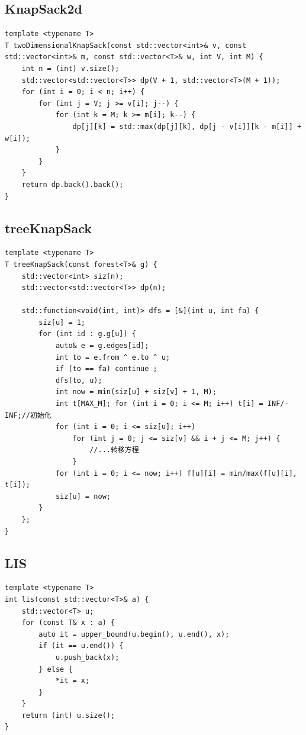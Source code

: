 \documentclass[twoside]{article}
\begin{document}
\subsection{KnapSack2d}
\begin{lstlisting}
template <typename T>
T twoDimensionalKnapSack(const std::vector<int>& v, const std::vector<int>& m, const std::vector<T>& w, int V, int M) {
    int n = (int) v.size();
    std::vector<std::vector<T>> dp(V + 1, std::vector<T>(M + 1));
    for (int i = 0; i < n; i++) {
        for (int j = V; j >= v[i]; j--) {
            for (int k = M; k >= m[i]; k--) {
                dp[j][k] = std::max(dp[j][k], dp[j - v[i]][k - m[i]] + w[i]);
            }
        }
    }
    return dp.back().back();
}\end{lstlisting}
\subsection{treeKnapSack}
\begin{lstlisting}
template <typename T>
T treeKnapSack(const forest<T>& g) {
    std::vector<int> siz(n);
    std::vector<std::vector<T>> dp(n);

    std::function<void(int, int)> dfs = [&](int u, int fa) {
        siz[u] = 1;
        for (int id : g.g[u]) {
            auto& e = g.edges[id];
            int to = e.from ^ e.to ^ u;
            if (to == fa) continue ;
            dfs(to, u);
            int now = min(siz[u] + siz[v] + 1, M);
            int t[MAX_M]; for (int i = 0; i <= M; i++) t[i] = INF/-INF;//初始化
            for (int i = 0; i <= siz[u]; i++)
                for (int j = 0; j <= siz[v] && i + j <= M; j++) {
                    //...转移方程
                }
            for (int i = 0; i <= now; i++) f[u][i] = min/max(f[u][i], t[i]);
            siz[u] = now;
        }
    };
} 
\end{lstlisting}
\subsection{LIS}
\begin{lstlisting}
template <typename T>
int lis(const std::vector<T>& a) {
    std::vector<T> u;
    for (const T& x : a) {
        auto it = upper_bound(u.begin(), u.end(), x);
        if (it == u.end()) {
            u.push_back(x);
        } else {
            *it = x;
        }
    }
    return (int) u.size();
}
\end{lstlisting}
\end{document}
